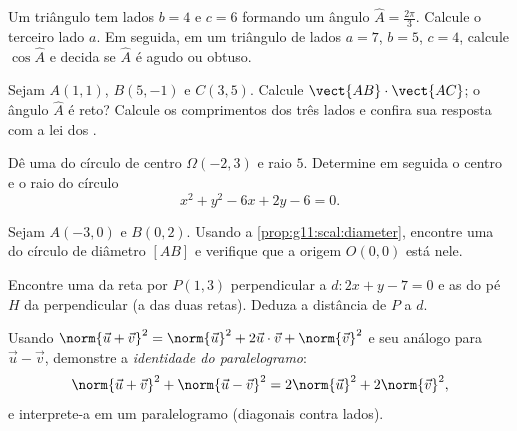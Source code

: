 \begin{exercise}[$\star\star$]\label{exo:g11:scal:5}
Um triângulo tem lados $b = 4$ e $c = 6$ formando um ângulo
$\widehat A = \frac{2\pi}{3}$. Calcule o terceiro lado $a$. Em seguida,
em um triângulo de lados $a = 7$, $b = 5$, $c = 4$, calcule
$\cos\widehat A$ e decida se $\widehat A$ é agudo ou obtuso.
\end{exercise}

\begin{exercise}[$\star\star$]\label{exo:g11:scal:6}
Sejam $A(1, 1)$, $B(5, -1)$ e $C(3, 5)$. Calcule
$\vect{AB} \cdot \vect{AC}$; o ângulo $\widehat A$ é reto? Calcule os
comprimentos dos três lados e confira sua resposta com a lei dos
.
\end{exercise}

\begin{exercise}[$\star\star$]\label{exo:g11:scal:7}
Dê uma  do círculo de centro $\Omega(-2, 3)$ e raio $5$. Determine
em seguida o centro e o raio do círculo
\[
x^2 + y^2 - 6x + 2y - 6 = 0 .
\]
\end{exercise}

\begin{exercise}[$\star\star$]\label{exo:g11:scal:8}
Sejam $A(-3, 0)$ e $B(0, 2)$. Usando a \cref{prop:g11:scal:diameter},
encontre uma  do círculo de diâmetro $[AB]$ e verifique que a
origem $O(0,0)$ está nele.
\end{exercise}

\begin{exercise}[$\star\star$]\label{exo:g11:scal:9}
Encontre uma  da reta por $P(1, 3)$ perpendicular a
$d : 2x + y - 7 = 0$ e as  do pé $H$ da perpendicular (a
 das duas retas). Deduza a distância de $P$ a $d$.
\end{exercise}

\begin{exercise}[$\star\star$]\label{exo:g11:scal:10}
Usando $\norm{\vec u + \vec v}^2 = \norm{\vec u}^2 + 2\vec u\cdot\vec v +
\norm{\vec v}^2$ e seu análogo para $\vec u - \vec v$, demonstre a
\emph{identidade do paralelogramo}:
\[
\norm{\vec u + \vec v}^2 + \norm{\vec u - \vec v}^2
= 2\norm{\vec u}^2 + 2\norm{\vec v}^2 ,
\]
e interprete-a em um paralelogramo (diagonais contra lados).
\end{exercise}

